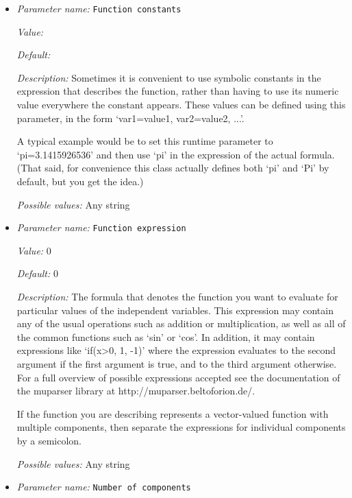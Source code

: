 \begin{itemize}
\item {\it Parameter name:} {\tt Function constants}
\label{parameters:Postprocess/Particles/Function/Function constants}


{\it Value:} 


{\it Default:} 


{\it Description:} Sometimes it is convenient to use symbolic constants in the expression that describes the function, rather than having to use its numeric value everywhere the constant appears. These values can be defined using this parameter, in the form `var1=value1, var2=value2, ...'.

A typical example would be to set this runtime parameter to `pi=3.1415926536' and then use `pi' in the expression of the actual formula. (That said, for convenience this class actually defines both `pi' and `Pi' by default, but you get the idea.)


{\it Possible values:} Any string
\item {\it Parameter name:} {\tt Function expression}
\label{parameters:Postprocess/Particles/Function/Function expression}


{\it Value:} 0


{\it Default:} 0


{\it Description:} The formula that denotes the function you want to evaluate for particular values of the independent variables. This expression may contain any of the usual operations such as addition or multiplication, as well as all of the common functions such as `sin' or `cos'. In addition, it may contain expressions like `if(x>0, 1, -1)' where the expression evaluates to the second argument if the first argument is true, and to the third argument otherwise. For a full overview of possible expressions accepted see the documentation of the muparser library at http://muparser.beltoforion.de/.

If the function you are describing represents a vector-valued function with multiple components, then separate the expressions for individual components by a semicolon.


{\it Possible values:} Any string
\item {\it Parameter name:} {\tt Number of components}
\label{parameters:Postprocess/Particles/Function/Number of components}



\end{itemize}
